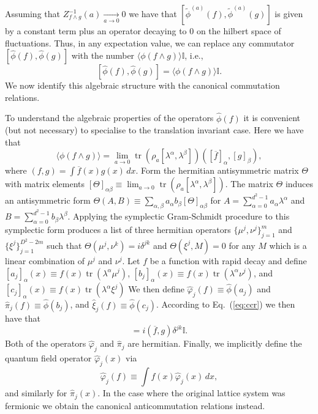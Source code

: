 \documentclass[prl,twocolumn,lengthcheck,superscriptaddress]{revtex4-1}
\newcommand{\tr}{\operatorname{tr}}
\theoremstyle{definition}
\theoremstyle{remark}
\begin{document}
Assuming that ${Z_{f\wedge g}^{-1}(a)} \underset{a\rightarrow 0}{\longrightarrow} 0$ we have that $[\widetilde{\phi}^{(a)}(f), \widetilde{\phi}^{(a)}(g)]$ is given by a constant term plus an operator decaying to $0$ on the hilbert space of fluctuations. Thus, in any expectation value, we can replace any commutator $[\widehat{\phi}(f), \widehat{\phi}(g)]$ with the number $\langle \phi(f\wedge g)\rangle \mathbb{I}$, i.e., 
\begin{equation}\label{eq:ccr}
	[\widehat{\phi}(f), \widehat{\phi}(g)] = \langle \phi(f\wedge g)\rangle \mathbb{I}.
\end{equation}
We now identify this algebraic structure with the canonical commutation relations. 

To understand the algebraic properties of the operators $\widehat{\phi}(f)$ it is convenient (but not necessary) to specialise to the translation invariant case. Here we have that 
\begin{equation}
	\langle \phi(f\wedge g)\rangle = \lim_{a\rightarrow 0} \tr(\rho_a [\lambda^\alpha,\lambda^\beta]) ([\overline{f}]_\alpha,[g]_\beta), 
\end{equation}
where $(f,g) = \int \overline{f}(x)g(x)\,dx$.
Form the hermitian antisymmetric matrix $\Theta$ with matrix elements $[\Theta]_{\alpha\beta}  \equiv \lim_{a\rightarrow 0} \tr(\rho_a [\lambda^\alpha,\lambda^\beta])$. The matrix $\Theta$ induces an antisymmetric form $\Theta(A,B) \equiv \sum_{\alpha,\beta} a_\alpha b_\beta [\Theta]_{\alpha\beta}$ for $A = \sum_{\alpha=0}^{d^2-1} a_\alpha \lambda^\alpha$ and  $B = \sum_{\alpha=0}^{d^2-1} b_\beta \lambda^\beta$. Applying the symplectic Gram-Schmidt procedure to this symplectic form produces a list of three hermitian operators $\{\mu^{j}, \nu^{j}\}_{j=1}^m$ and  $\{\xi^{j}\}_{j = 1}^{D^2-2m}$ such that $\Theta(\mu^j, \nu^k) = i\delta^{jk}$ and $\Theta(\xi^j, M) = 0$ for any $M$ which is a linear combination of $\mu^j$ and $\nu^j$. Let $f$ be a function with rapid decay and define $[a_j]_\alpha(x) \equiv f(x) \tr(\lambda^\alpha\mu^j)$, $[b_j]_\alpha(x) \equiv f(x) \tr(\lambda^\alpha\nu^j)$, and $[c_j]_\alpha(x) \equiv f(x) \tr(\lambda^\alpha\xi^j)$ We then define $\widehat{\varphi}_j(f) \equiv \widehat{\phi}(a_j)$ and $\widehat{\pi}_j(f) \equiv \widehat{\phi}(b_j)$, and $\widehat{\xi}_j(f) \equiv \widehat{\phi}(c_j)$. According to Eq.~(\ref{eq:ccr}) we then have that
\begin{equation}
	[\widehat{\varphi}_j(f), \widehat{\pi}_k(g)] = i (\overline{f},g)\delta^{jk} \mathbb{I}.
\end{equation}
Both of the operators $\widehat{\varphi}_j$ and $\widehat{\pi}_j$ are hermitian.
Finally, we implicitly define the quantum field operator $\widehat{\varphi}_j(x)$ via
\begin{equation}
	\widehat{\varphi}_j(f) \equiv \int f(x)\widehat{\varphi}_j(x)\,dx,
\end{equation}
and similarly for $\widehat{\pi}_j(x)$. In the case where the original lattice system was fermionic we obtain the canonical anticommutation relations instead.
\end{document}
